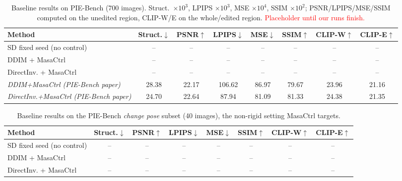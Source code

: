 \begin{table}[t]
\centering
\small
\begin{tabular}{lccccccc}
\toprule
Method & Struct.$\downarrow$ & PSNR$\uparrow$ & LPIPS$\downarrow$ & MSE$\downarrow$ & SSIM$\uparrow$ & CLIP-W$\uparrow$ & CLIP-E$\uparrow$ \\
\midrule
SD fixed seed (no control) & -- & -- & -- & -- & -- & -- & -- \\
DDIM + MasaCtrl & -- & -- & -- & -- & -- & -- & -- \\
DirectInv. + MasaCtrl & -- & -- & -- & -- & -- & -- & -- \\
\midrule
\textit{DDIM+MasaCtrl (PIE-Bench paper)} & 28.38 & 22.17 & 106.62 & 86.97 & 79.67 & 23.96 & 21.16 \\
\textit{DirectInv.+MasaCtrl (PIE-Bench paper)} & 24.70 & 22.64 & 87.94 & 81.09 & 81.33 & 24.38 & 21.35 \\
\bottomrule
\end{tabular}
\caption{Baseline results on PIE-Bench (700 images). Struct.\ $\times10^3$, LPIPS $\times10^3$, MSE $\times10^4$, SSIM $\times10^2$; PSNR/LPIPS/MSE/SSIM computed on the unedited region, CLIP-W/E on the whole/edited region. \textcolor{red}{Placeholder until our runs finish.}}
\label{tab:baseline}
\end{table}

\begin{table}[t]
\centering
\small
\begin{tabular}{lccccccc}
\toprule
Method & Struct.$\downarrow$ & PSNR$\uparrow$ & LPIPS$\downarrow$ & MSE$\downarrow$ & SSIM$\uparrow$ & CLIP-W$\uparrow$ & CLIP-E$\uparrow$ \\
\midrule
SD fixed seed (no control) & -- & -- & -- & -- & -- & -- & -- \\
DDIM + MasaCtrl & -- & -- & -- & -- & -- & -- & -- \\
DirectInv. + MasaCtrl & -- & -- & -- & -- & -- & -- & -- \\
\bottomrule
\end{tabular}
\caption{Baseline results on the PIE-Bench \emph{change pose} subset (40 images), the non-rigid setting MasaCtrl targets.}
\label{tab:baseline_pose}
\end{table}

